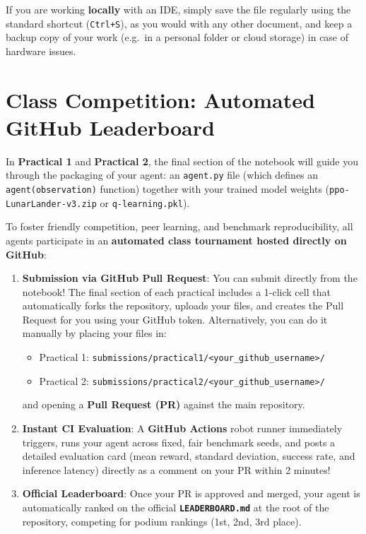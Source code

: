 \documentclass[11pt,a4paper]{article}
\begin{document}
If you are working \textbf{locally} with an IDE, simply save the file regularly using the standard shortcut (\texttt{Ctrl+S}), as you would with any other document, and keep a backup copy of your work (e.g.\ in a personal folder or cloud storage) in case of hardware issues.

\section{Class Competition: Automated GitHub Leaderboard}
\label{sec:leaderboard}

In \textbf{Practical 1} and \textbf{Practical 2}, the final section of the notebook will guide you through the packaging of your agent: an \texttt{agent.py} file (which defines an \texttt{agent(observation)} function) together with your trained model weights (\texttt{ppo-LunarLander-v3.zip} or \texttt{q-learning.pkl}).

To foster friendly competition, peer learning, and benchmark reproducibility, all agents participate in an \textbf{automated class tournament hosted directly on GitHub}:

\begin{enumerate}
    \item \textbf{Submission via GitHub Pull Request}: You can submit directly from the notebook! The final section of each practical includes a 1-click cell that automatically forks the repository, uploads your files, and creates the Pull Request for you using your GitHub token. Alternatively, you can do it manually by placing your files in:
    \begin{itemize}
        \item Practical 1: \texttt{submissions/practical1/<your\_github\_username>/}
        \item Practical 2: \texttt{submissions/practical2/<your\_github\_username>/}
    \end{itemize}
    and opening a \textbf{Pull Request (PR)} against the main repository.
    \item \textbf{Instant CI Evaluation}: A \textbf{GitHub Actions} robot runner immediately triggers, runs your agent across fixed, fair benchmark seeds, and posts a detailed evaluation card (mean reward, standard deviation, success rate, and inference latency) directly as a comment on your PR within 2 minutes!
    \item \textbf{Official Leaderboard}: Once your PR is approved and merged, your agent is automatically ranked on the official \textbf{\texttt{LEADERBOARD.md}} at the root of the repository, competing for podium rankings (1st, 2nd, 3rd place).
\end{enumerate}
\end{document}
